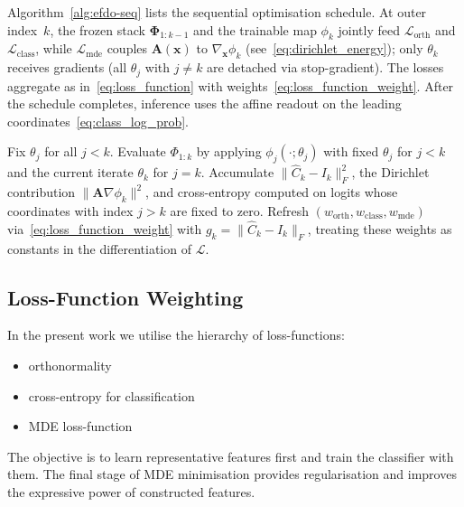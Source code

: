 \documentclass{article}
\theoremstyle{plain}
\theoremstyle{definition}
\theoremstyle{remark}
\begin{document}
Algorithm~\ref{alg:efdo-seq} lists the sequential optimisation schedule.
At outer index~$k$, the frozen stack $\boldsymbol{\Phi}_{1{:}k-1}$ and the trainable map $\phi_k$ jointly feed $\mathcal{L}_{\mathrm{orth}}$ and $\mathcal{L}_{\mathrm{class}}$, while $\mathcal{L}_{\mathrm{mde}}$ couples $\mathbf{A}(\mathbf{x})$ to $\nabla_{\mathbf{x}}\phi_k$ (see~\eqref{eq:dirichlet_energy}); only $\theta_k$ receives gradients (all $\theta_j$ with $j \neq k$ are detached via stop-gradient).
The losses aggregate as in~\eqref{eq:loss_function} with weights~\eqref{eq:loss_function_weight}.
After the schedule completes, inference uses the affine readout on the leading coordinates~\eqref{eq:class_log_prob}.

\begin{algorithm}[tb]
 \caption{Sequential block-coordinate descent for EFDO.}
 \label{alg:efdo-seq}
 \begin{algorithmic}[1]
    \STATE Fix $\theta_j$ for all $j<k$.
    \STATE Evaluate $\Phi_{1:k}$ by applying $\phi_j(\cdot;\theta_j)$ with fixed $\theta_j$ for $j<k$ and the current iterate $\theta_k$ for $j=k$.
    \STATE Accumulate $\|\hat C_k-I_k\|_F^{2}$, the Dirichlet contribution $\|\mathbf{A}\nabla\phi_k\|^2$, and cross-entropy computed on logits whose coordinates with index $j>k$ are fixed to zero.
    \STATE Refresh $(w_{\mathrm{orth}},w_{\mathrm{class}},w_{\mathrm{mde}})$ via~\eqref{eq:loss_function_weight} with $g_k=\|\hat C_k-I_k\|_F$, treating these weights as constants in the differentiation of $\mathcal{L}$.
   \ENDFOR
 \ENDFOR
 \end{algorithmic}
\end{algorithm}

\subsection{Loss-Function Weighting}
\label{subsec:loss_function_weigting}
In the present work we utilise the hierarchy of loss-functions:
\begin{itemize}
    \item orthonormality
    \item cross-entropy for classification
    \item MDE loss-function
\end{itemize}
The objective is to learn representative features first and train the classifier with them.
The final stage of MDE minimisation provides regularisation and improves the expressive power of constructed features.
\end{document}
